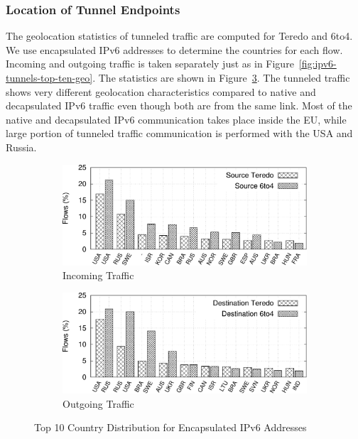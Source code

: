 \subsubsection{Location of Tunnel Endpoints}
The geolocation statistics of tunneled traffic are computed for Teredo and 6to4. We use encapsulated IPv6 addresses to determine the countries for each flow. Incoming and outgoing traffic is taken separately just as in Figure~\ref{fig:ipv6-tunnels-top-ten-geo}. The statistics are shown in Figure~\ref{fig:ipv6-tunnels-geo-tun-both}.
The tunneled traffic shows very different geolocation characteristics compared to native and decapsulated IPv6 traffic even though both are from the same link. 
Most of the native and decapsulated IPv6 communication takes place inside the EU, while large portion of tunneled traffic communication is performed with the USA and Russia. 

\begin{figure}[!tb]
    \begin{subfigure}{\textwidth}
        \includegraphics[width=0.97\linewidth]{figures/paper-tunnels/ctry_distribution/ctry_distribution-tun-in}
        \caption{Incoming Traffic}
        \label{fig:ipv6-tunnels-geo-tun-in}
    \end{subfigure}
    \begin{subfigure}{\textwidth}
        \includegraphics[width=0.97\linewidth]{figures/paper-tunnels/ctry_distribution/ctry_distribution-tun-out}
        \caption{Outgoing Traffic}
        \label{fig:ipv6-tunnels-eo-tun-out}
    \end{subfigure}
    \caption{Top 10 Country Distribution for Encapsulated IPv6 Addresses}
    \label{fig:ipv6-tunnels-geo-tun-both}
\end{figure}

